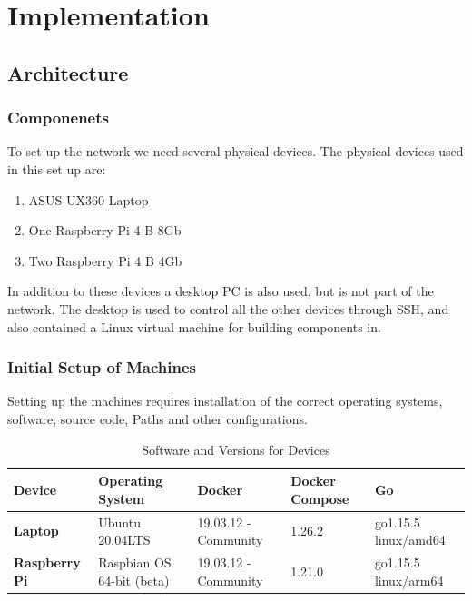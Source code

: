 \chapter{Implementation}\label{Implementation}
\section{Architecture}
\subsection{Componenets}

To set up the network we need several physical devices. The physical devices used in this set up are:

\begin{enumerate}
    \item ASUS UX360 Laptop
    \item One Raspberry Pi 4 B 8Gb
    \item Two Raspberry Pi 4 B 4Gb 
\end{enumerate}

In addition to these devices a desktop PC is also used, but is not part of the network. The desktop is used to control all the other devices through SSH, and also contained a Linux virtual machine for building components in.


\subsection{Initial Setup of Machines}
Setting up the machines requires installation of the correct operating systems, software, source code, Paths and other configurations.

\begin{table}[htb]
    \caption{Software and Versions for Devices}
    \renewcommand{\arraystretch}{2}
    \begin{tabular}{|p{2cm}|p{2.5cm}|p{2cm}|p{2.2cm}|p{2.2cm}|}
      \hline
        \textbf{Device}         & \textbf{Operating System}    & \textbf{Docker}               & \textbf{Docker Compose} & \textbf{Go}         \\[10pt] \hline 
        \textbf{Laptop}         & Ubuntu 20.04LTS              & 19.03.12 - Community          &  1.26.2              & go1.15.5 linux/amd64   \\[10pt] \hline 
        \textbf{Raspberry Pi}   & Raspbian OS 64-bit (beta)    & 19.03.12 - Community          & 1.21.0               & go1.15.5 linux/arm64   \\[10pt] \hline 

    \end{tabular}
\end{table}

